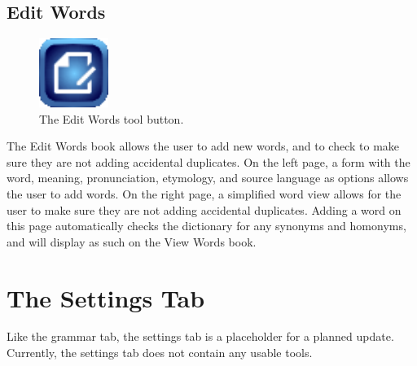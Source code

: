 \documentclass{report}
\begin{document}
	\section{Edit Words}
	\begin{figure}
		\centering
		\includegraphics[width=0.2\textwidth]{img/edit-words}
		\caption{The Edit Words tool button.}
		\label{fig:edit-words}
	\end{figure}
	The Edit Words book allows the user to add new words, and to check to make sure they are not adding accidental duplicates. On the left page, a form with the word, meaning, pronunciation, etymology, and source language as options allows the user to add words. On the right page, a simplified word view allows for the user to make sure they are not adding accidental duplicates. Adding a word on this page automatically checks the dictionary for any synonyms and homonyms, and will display as such on the View Words book.
	
	\chapter{The Settings Tab}
	Like the grammar tab, the settings tab is a placeholder for a planned update. Currently,
	the settings tab does not contain any usable tools.
	
\end{document}
